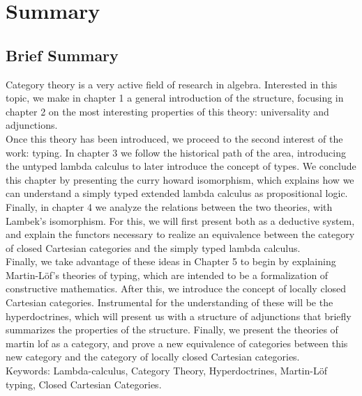
\newpage



\chapter*{Summary}
\section*{Brief Summary}
Category theory is a very active field of research in algebra. Interested in this topic, we make in chapter 1 a general introduction of the structure, focusing in chapter 2 on the most interesting properties of this theory: universality and adjunctions. \\

Once this theory has been introduced, we proceed to the second interest of the work: typing. In chapter 3 we follow the historical path of the area, introducing the untyped lambda calculus to later introduce the concept of types. We conclude this chapter by presenting the curry howard isomorphism, which explains how we can understand a simply typed extended lambda calculus as propositional logic.\\

Finally, in chapter 4 we analyze the relations between the two theories, with Lambek's isomorphism. For this, we will first present both as a deductive system, and explain the functors necessary to realize an equivalence between the category of closed Cartesian categories and the simply typed lambda calculus.\\

Finally, we take advantage of these ideas in Chapter 5 to begin by explaining Martin-L\"of's theories of typing, which are intended to be a formalization of constructive mathematics. After this, we introduce the concept of locally closed Cartesian categories. Instrumental for the understanding of these will be the hyperdoctrines, which will present us with a structure of adjunctions that briefly summarizes the properties of the structure. Finally, we present the theories of martin lof as a category, and prove a new equivalence of categories between this new category and the category of locally closed Cartesian categories. \\

{Keywords: Lambda-calculus, Category Theory, Hyperdoctrines, Martin-L\"of typing, Closed Cartesian Categories.} 



